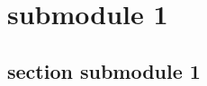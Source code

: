 \documentclass[module]{subfiles}
\begin{document}

\chapter{submodule 1}

\section{section submodule 1}
\lipsum[1]
\end{document}
